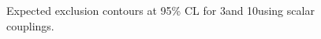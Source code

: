 \begin{figure}[h]
  \centering
  \caption{\label{fig:limits_S} Expected exclusion contours at 95\% CL for 3\fbinv and 10\fbinv using scalar couplings. }
\end{figure}


